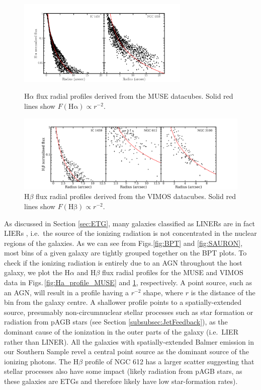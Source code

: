 		\begin{figure}
			\centering
			\includegraphics[width=0.73\textwidth]{chapter5/muse/Halpha_profile.png}
			\caption[MUSE H$\alpha$ radial profiles]{H$\alpha$ flux radial profiles derived from the MUSE datacubes. Solid red lines show $F(\mathrm{H\alpha}) \propto r^{-2}$.\label{fig:Ha_profile_MUSE}} 

			\includegraphics[width=1.1\textwidth]{chapter5/vimos/Hbeta_profile.png}
			\caption[VIMOS H$\beta$ radial profiles]{H$\beta$ flux radial profiles derived from the VIMOS datacubes. Solid red lines show $F(\mathrm{H\beta}) \propto r^{-2}$.\label{fig:Hb_profile_VIMOS}} 
		\end{figure}
		
		As discussed in Section \ref{sec:ETG}, many galaxies classified as LINERs are in fact LIERs \citep[see e.g.][]{Sarzi2005, Sarzi2010, Singh2013, Belfiore2016}, i.e.\ the source of the ionizing radiation is not concentrated in the nuclear regions of the galaxies. As we can see from Figs.\ref{fig:BPT} and \ref{fig:SAURON}, most bins of a given galaxy are tightly grouped together on the BPT plots. To check if the ionizing radiation is entirely due to an AGN throughout the host galaxy, we plot the H$\alpha$ and H$\beta$ flux radial profiles for the MUSE and VIMOS data in Figs.\,\ref{fig:Ha_profile_MUSE} and \ref{fig:Hb_profile_VIMOS}, respectively. A point source, such as an AGN, will result in a profile having a $r^{-2}$ shape, where $r$ is the distance of the bin from the galaxy centre. A shallower profile points to a spatially-extended source, presumably non-circumnuclear stellar processes such as star formation or radiation from pAGB stars (see Section \ref{subsubsec:JetFeedback}), as the dominant cause of the ionization in the outer parts of the galaxy (i.e.\ LIER rather than LINER). All the galaxies with spatially-extended Balmer emission in our Southern Sample revel a central point source as the dominant source of the ionizing photons. The H$\beta$ profile of NGC 612 has a larger scatter suggesting that stellar processes also have some impact (likely radiation from pAGB stars, as these galaxies are ETGs and therefore likely have low star-formation rates).

